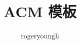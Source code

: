\documentclass{probook}
\title{ACM 模板}
\author{rogeryoungh}
\begin{document}
\newcommand\mfrac[2]{\dfrac{#1\smash[b]{\strut}}{#2\smash[t]{\strut}}}
\newcommand\ee{\mathrm{e}}
\newcommand\dd{\mathrm{d}}
\newcommand\uppi{\mathrm{\pi}}

\maketitle

\frontmatter

\tableofcontents

\mainmatter

\end{document}
